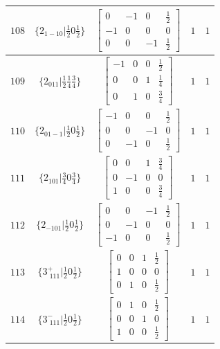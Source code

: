 \documentclass[fleqn,8pt]{jsarticle}
\begin{document}
\begin{longtable}{ccccc}
$ 108 $ & $ \{2{}_{1-10}|\frac{1}{2} 0 \frac{1}{2}\} $ & $ \begin{bmatrix} 0 & -1 & 0 & \frac{1}{2} \\ -1 & 0 & 0 & 0 \\ 0 & 0 & -1 & \frac{1}{2} \end{bmatrix} $ & $ 1 $ & $ 1 $ \\ \hline
$ 109 $ & $ \{2{}_{011}|\frac{1}{2} \frac{1}{4} \frac{3}{4}\} $ & $ \begin{bmatrix} -1 & 0 & 0 & \frac{1}{2} \\ 0 & 0 & 1 & \frac{1}{4} \\ 0 & 1 & 0 & \frac{3}{4} \end{bmatrix} $ & $ 1 $ & $ 1 $ \\ \hline
$ 110 $ & $ \{2{}_{01-1}|\frac{1}{2} 0 \frac{1}{2}\} $ & $ \begin{bmatrix} -1 & 0 & 0 & \frac{1}{2} \\ 0 & 0 & -1 & 0 \\ 0 & -1 & 0 & \frac{1}{2} \end{bmatrix} $ & $ 1 $ & $ 1 $ \\ \hline
$ 111 $ & $ \{2{}_{101}|\frac{3}{4} 0 \frac{3}{4}\} $ & $ \begin{bmatrix} 0 & 0 & 1 & \frac{3}{4} \\ 0 & -1 & 0 & 0 \\ 1 & 0 & 0 & \frac{3}{4} \end{bmatrix} $ & $ 1 $ & $ 1 $ \\ \hline
$ 112 $ & $ \{2{}_{-101}|\frac{1}{2} 0 \frac{1}{2}\} $ & $ \begin{bmatrix} 0 & 0 & -1 & \frac{1}{2} \\ 0 & -1 & 0 & 0 \\ -1 & 0 & 0 & \frac{1}{2} \end{bmatrix} $ & $ 1 $ & $ 1 $ \\ \hline
$ 113 $ & $ \{3^{+}_{\,\,111}|\frac{1}{2} 0 \frac{1}{2}\} $ & $ \begin{bmatrix} 0 & 0 & 1 & \frac{1}{2} \\ 1 & 0 & 0 & 0 \\ 0 & 1 & 0 & \frac{1}{2} \end{bmatrix} $ & $ 1 $ & $ 1 $ \\ \hline
$ 114 $ & $ \{3^{-}_{\,\,111}|\frac{1}{2} 0 \frac{1}{2}\} $ & $ \begin{bmatrix} 0 & 1 & 0 & \frac{1}{2} \\ 0 & 0 & 1 & 0 \\ 1 & 0 & 0 & \frac{1}{2} \end{bmatrix} $ & $ 1 $ & $ 1 $ \\ \hline

\end{longtable}
\end{document}

